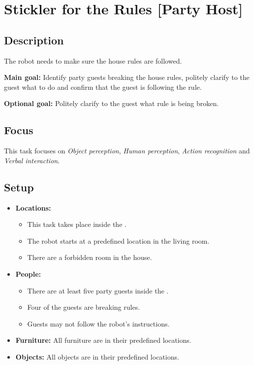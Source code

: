 \section{Stickler for the Rules [Party Host]}
\label{test:stickler-for-the-rules}

\subsection*{Description}
The robot needs to make sure the house rules are followed.

\textbf{Main goal:}
Identify party guests breaking the house rules, politely clarify to the guest what to do and confirm that the guest is following the rule.

\textbf{Optional goal:}
Politely clarify to the guest what rule is being broken.


\subsection*{Focus}
This task focuses on
\textit{Object perception},
\textit{Human perception},
\textit{Action recognition} and
\textit{Verbal interaction}.

\subsection*{Setup}
\begin{itemize}[nosep]	
	\item \textbf{Locations:} 
	\begin{itemize}
		\item This task takes place inside the \Arena{}.
		\item The robot starts at a predefined location in the living room.
		\item There are a forbidden room in the house.
	\end{itemize}	 
	\item \textbf{People:} 
	\begin{itemize}
		\item There are at least five party guests inside the \Arena{}.
		\item Four of the guests are breaking rules.
		\item Guests may not follow the robot's instructions.
	\end{itemize}
	\item \textbf{Furniture:} All furniture are in their predefined locations.
	\item \textbf{Objects:} All objects are in their predefined locations.
\end{itemize}

